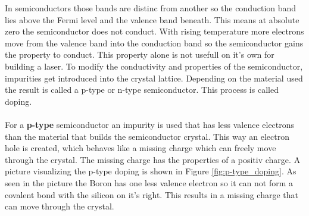 In semiconductors those bands are distinc from another so the conduction band lies above the Fermi level and the valence band beneath.
This means at absolute zero the semiconductor does not conduct.
With rising temperature more electrons move from the valence band into the conduction band so the semiconductor gains the property to conduct.
This property alone is not usefull on it's own for building a laser.
To modify the conductivity and properties of the semiconductor, impurities get introduced into the crystal lattice.
Depending on the material used the result is called a p-type or n-type semiconductor.
This process is called doping.
\\\\
\FloatBarrier
For a \textbf{p-type} semiconductor an impurity is used that has less valence electrons than the material that builds the semiconductor crystal.
This way an electron hole is created, which behaves like a missing charge which can freely move through the crystal.
The missing charge has the properties of a positiv charge.
A picture visualizing the p-type doping is shown in Figure \ref{fig:p-type_doping}.
As seen in the picture the Boron has one less valence electron so it can not form a covalent bond with the silicon on it's right.
This results in a missing charge that can move through the crystal.
